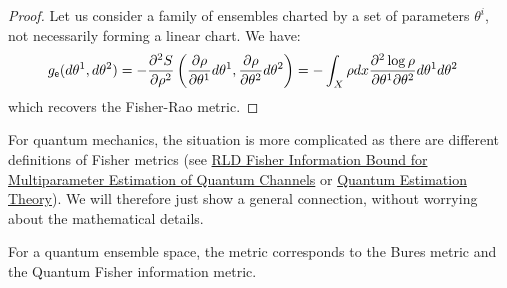\begin{proof}
	Let us consider a family of ensembles charted by a set of parameters $\theta^i$, not necessarily forming a linear chart. We have:
	\begin{equation}
		\begin{aligned}
			g_{\mathsf{e}}(d\theta^1, d\theta^2) &= - \frac{\partial^2 S}{\partial \rho^2}\left(\frac{\partial 
				\rho}{\partial \theta^1} d\theta^1, \frac{\partial 
				\rho}{\partial \theta^2} d\theta^2\right) = - \int_X \rho dx \frac{\partial^2 \log \rho}{\partial \theta^1 \partial \theta^2}d\theta^1 d\theta^2
		\end{aligned}
	\end{equation}
	which recovers the Fisher-Rao metric.
	
\end{proof}

\begin{remark}
	For quantum mechanics, the situation is more complicated as there are different definitions of Fisher metrics (see \href{https://arxiv.org/pdf/2008.11178}{RLD Fisher Information Bound for Multiparameter
	Estimation of Quantum Channels} or \href{https://link.springer.com/chapter/10.1007/978-4-431-54493-7_4}{Quantum Estimation Theory}). We will therefore just show a general connection, without worrying about the mathematical details.
	
\end{remark}

\begin{prop}
	For a quantum ensemble space, the metric corresponds to the Bures metric and the Quantum Fisher information metric.
\end{prop}


